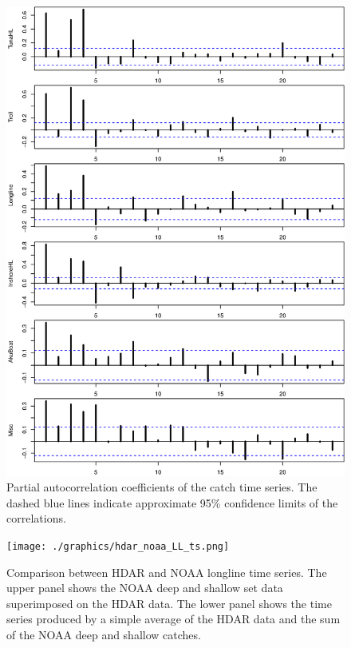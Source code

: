\documentclass[12pt,letterpaper]{article}
\begin{document}
\begin{figure}
\begin{center}
\includegraphics[height=0.9\textheight]{./graphics/partial_acf.png}
\caption{\label{fig:catchPACF}
Partial autocorrelation coefficients of the catch time series. The
dashed blue lines indicate approximate 95\% confidence limits of the
correlations.}
\end{center}
\end{figure}

\begin{figure}
\begin{center}
\texttt{[image: ./graphics/hdar\_noaa\_LL\_ts.png]}
\caption{\label{fig:hdarnoaaLLTS}
Comparison between HDAR and NOAA longline time series. The upper panel
shows the NOAA deep and shallow set data superimposed on the HDAR
data. The lower panel shows the time series produced by a simple
average of the HDAR data and the sum of the NOAA deep and shallow
catches.}
\end{center}
\end{figure}
\end{document}
